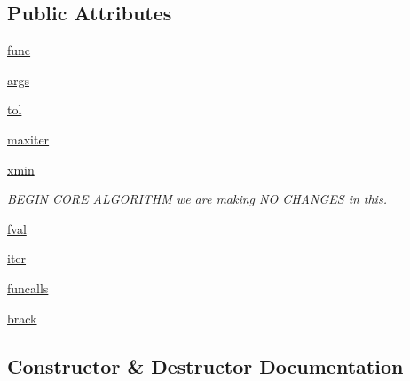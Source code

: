 \subsection*{Public Attributes}
\begin{DoxyCompactItemize}
\item 
\hyperlink{classscipy_1_1optimize_1_1optimize_1_1Brent_af516322c37ef34ec6318b233637a5beb}{func}
\item 
\hyperlink{classscipy_1_1optimize_1_1optimize_1_1Brent_aba85f33ffc92b6a4d265f2122b56bb39}{args}
\item 
\hyperlink{classscipy_1_1optimize_1_1optimize_1_1Brent_a43c2779730e26bbfa79ff2c7273b23b2}{tol}
\item 
\hyperlink{classscipy_1_1optimize_1_1optimize_1_1Brent_abcbec298d1ef524c0aab8f41b2156516}{maxiter}
\item 
\hyperlink{classscipy_1_1optimize_1_1optimize_1_1Brent_ab14c763f87128fc218426f32f235e34c}{xmin}
\begin{DoxyCompactList}\small\item\em B\+E\+G\+I\+N C\+O\+R\+E A\+L\+G\+O\+R\+I\+T\+H\+M we are making N\+O C\+H\+A\+N\+G\+E\+S in this. \end{DoxyCompactList}\item 
\hyperlink{classscipy_1_1optimize_1_1optimize_1_1Brent_af07cbfcd6d322cc1c4192dce1d500e2c}{fval}
\item 
\hyperlink{classscipy_1_1optimize_1_1optimize_1_1Brent_a205c67a4ae9eaac2289fd16acf0f8bd9}{iter}
\item 
\hyperlink{classscipy_1_1optimize_1_1optimize_1_1Brent_ace5668fa2e55f26b3acb9868e68e703c}{funcalls}
\item 
\hyperlink{classscipy_1_1optimize_1_1optimize_1_1Brent_abbbf382280774b9941fc367a11a8b969}{brack}
\end{DoxyCompactItemize}


\subsection{Constructor \& Destructor Documentation}
\hypertarget{classscipy_1_1optimize_1_1optimize_1_1Brent_a5e0071bedd1188c15f0516125e0d60be}{}
